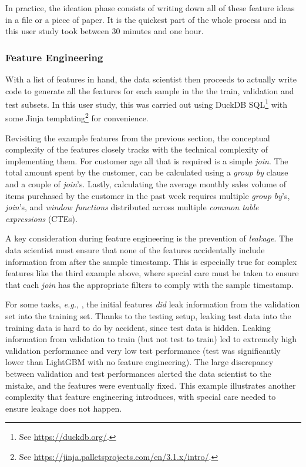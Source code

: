 In practice, the ideation phase consists of writing down all of these feature ideas in a file or a piece of paper. It is the quickest part of the whole process and in this user study took between 30 minutes and one hour.

\subsubsection{Feature Engineering}

With a list of features in hand, the data scientist then proceeds to actually write code to generate all the features for each sample in the the train, validation and test subsets. In this user study, this was carried out using DuckDB SQL\footnote{See \url{https://duckdb.org/}.} with some Jinja templating\footnote{See \url{https://jinja.palletsprojects.com/en/3.1.x/intro/}.} for convenience.

Revisiting the example features from the previous section, the conceptual complexity of the features closely tracks with the technical complexity of implementing them. For customer age all that is required is a simple \textit{join}. The total amount spent by the customer, can be calculated using a \textit{group by} clause and a couple of \textit{join}'s. Lastly, calculating the average monthly sales volume of items purchased by the customer in the past week requires multiple \textit{group by}'s, \textit{join}'s, and \textit{window functions} distributed across multiple \textit{common table expressions} (CTEs).

A key consideration during feature engineering is the prevention of \textit{leakage}. The data scientist must ensure that none of the features accidentally include information from after the sample timestamp. This is especially true for complex features like the third example above, where special care must be taken to ensure that each \textit{join} has the appropriate filters to comply with the sample timestamp. 

For some tasks, \emph{e.g.}, \studyOutcome, the initial features \emph{did} leak information from the validation set into the training set. Thanks to the \relbench testing setup, leaking test data into the training data is hard to do by accident, since test data is hidden. Leaking information from validation to train (but not test to train) led to extremely high validation performance and very low test performance (test was significantly lower than LightGBM with no feature engineering). The large discrepancy between validation and test performances alerted the data scientist to the mistake, and the features were eventually fixed. This example illustrates another complexity that feature engineering introduces, with special care needed to ensure leakage does not happen. 

